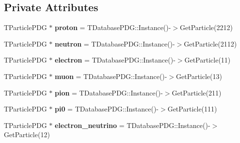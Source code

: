 \subsection*{Private Attributes}
\begin{DoxyCompactItemize}
\item 
\hypertarget{classanalysis_1_1DefaultAnalysis_a93050a6176a0497f73a16db74a686c53}{T\-Particle\-P\-D\-G $\ast$ {\bfseries proton} = T\-Database\-P\-D\-G\-::\-Instance()-\/$>$Get\-Particle(2212)}\label{classanalysis_1_1DefaultAnalysis_a93050a6176a0497f73a16db74a686c53}

\item 
\hypertarget{classanalysis_1_1DefaultAnalysis_a82cdc332e30f34fd12ec5493808cc28c}{T\-Particle\-P\-D\-G $\ast$ {\bfseries neutron} = T\-Database\-P\-D\-G\-::\-Instance()-\/$>$Get\-Particle(2112)}\label{classanalysis_1_1DefaultAnalysis_a82cdc332e30f34fd12ec5493808cc28c}

\item 
\hypertarget{classanalysis_1_1DefaultAnalysis_a1089802dee9a5e84c00e7e007dde2746}{T\-Particle\-P\-D\-G $\ast$ {\bfseries electron} = T\-Database\-P\-D\-G\-::\-Instance()-\/$>$Get\-Particle(11)}\label{classanalysis_1_1DefaultAnalysis_a1089802dee9a5e84c00e7e007dde2746}

\item 
\hypertarget{classanalysis_1_1DefaultAnalysis_a497f1c0211f19df2985b622a4c536933}{T\-Particle\-P\-D\-G $\ast$ {\bfseries muon} = T\-Database\-P\-D\-G\-::\-Instance()-\/$>$Get\-Particle(13)}\label{classanalysis_1_1DefaultAnalysis_a497f1c0211f19df2985b622a4c536933}

\item 
\hypertarget{classanalysis_1_1DefaultAnalysis_a8eefb85a44d77ee187587fb687edda77}{T\-Particle\-P\-D\-G $\ast$ {\bfseries pion} = T\-Database\-P\-D\-G\-::\-Instance()-\/$>$Get\-Particle(211)}\label{classanalysis_1_1DefaultAnalysis_a8eefb85a44d77ee187587fb687edda77}

\item 
\hypertarget{classanalysis_1_1DefaultAnalysis_a01ede37c4c112f9fd8e4bd4e0b33d123}{T\-Particle\-P\-D\-G $\ast$ {\bfseries pi0} = T\-Database\-P\-D\-G\-::\-Instance()-\/$>$Get\-Particle(111)}\label{classanalysis_1_1DefaultAnalysis_a01ede37c4c112f9fd8e4bd4e0b33d123}

\item 
\hypertarget{classanalysis_1_1DefaultAnalysis_adba116e53c02e5f2de721bc7a7eb909e}{T\-Particle\-P\-D\-G $\ast$ {\bfseries electron\-\_\-neutrino} = T\-Database\-P\-D\-G\-::\-Instance()-\/$>$Get\-Particle(12)}\label{classanalysis_1_1DefaultAnalysis_adba116e53c02e5f2de721bc7a7eb909e}


\end{DoxyCompactItemize}
